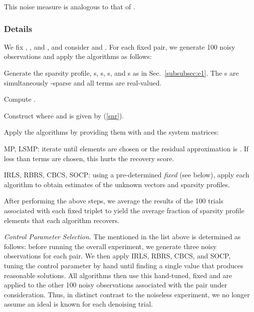 \documentclass[final]{siamltex}
\newenvironment{adamItemize2}{\begin{list}{}
{\setlength{\rightmargin}{0em}
\setlength{\leftmargin}{1.0em}
\setlength{\itemsep}{4pt}
\setlength{\topsep}{2pt}
\setlength{\parsep}{0pt}}}{\end{list}}
\begin{document}
   This noise measure is analogous to that of \cite{Cot2005}.
    
   \subsubsection{Details}\label{subsubsec:e2}
    We fix , , and , and consider  and .
   For each fixed  pair, we generate 100 noisy
   observations and apply the algorithms as follows:
   \begin{adamItemize2}

     \item Generate the sparsity profile, s, s,
     s, and s as in Sec.~\ref{subsubsec:e1}.  The
     s are simultaneously -sparse and all terms are
     real-valued.

     \item Compute .

     \item Construct  where  and
      is given by (\ref{snr}).

     \item Apply the algorithms by providing them with
      and the system matrices:

        \begin{adamItemize2}

        \item[] MP, LSMP: iterate until  elements are
        chosen or the residual approximation is .  If less
        than  terms are chosen, this hurts the recovery score.

        \item[] IRLS, RBRS, CBCS, SOCP: using a pre-determined
        {\em{fixed}}  (see below), apply each algorithm to
        obtain estimates of the unknown vectors and sparsity profiles.

        \end{adamItemize2}

   \end{adamItemize2} After performing the above steps, we average the
   results of the 100 trials associated with each fixed  triplet to yield the average fraction of sparsity
   profile elements that each algorithm recovers.

   {\em{Control Parameter Selection}.} The  mentioned in the
   list above is determined as follows: before running the overall
   experiment, we generate three noisy observations for each
    pair.  We then apply IRLS, RBRS, CBCS, and SOCP,
   tuning the control parameter  by hand until finding a
   single value that produces reasonable solutions.  All algorithms
   then use this hand-tuned, fixed  and are applied to the
   other 100 noisy observations associated with the 
   pair under consideration.  Thus, in distinct contrast to the
   noiseless experiment, we no longer assume an ideal  is
   known for each denoising trial.
\end{document}
